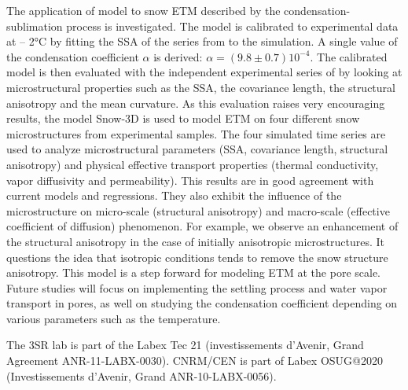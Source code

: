 \documentclass[draft,ms]{agujournal2019}
\begin{document}
The application of  model to snow ETM described by the condensation-sublimation process is investigated. The model is calibrated to experimental data at – 2°C by fitting the SSA of the series from  to the simulation. A single value of the condensation coefficient $\alpha$ is derived: $\alpha = ( 9.8 \pm 0.7) 10^{-4}$. The calibrated model is then evaluated with the independent experimental series of  by looking at microstructural properties such as the SSA, the covariance length, the structural anisotropy and the mean curvature. As this evaluation raises very encouraging results, the model Snow-3D is used to model ETM on four different snow microstructures from experimental samples. The four simulated time series are used to analyze microstructural parameters (SSA, covariance length, structural anisotropy) and physical effective transport properties (thermal conductivity, vapor diffusivity and permeability). This results are in good agreement with current models and regressions. They also exhibit the influence of the microstructure on micro-scale (structural anisotropy) and macro-scale (effective coefficient of diffusion) phenomenon. For example, we observe an enhancement of the structural anisotropy in the case of initially anisotropic microstructures. It questions the idea that isotropic conditions tends to remove the snow structure anisotropy. This model is a step forward for modeling ETM at the pore scale. Future studies will focus on implementing the settling process and water vapor transport in pores, as well on studying the condensation coefficient depending on various parameters such as the temperature.  

\acknowledgments
The 3SR lab is part of the Labex Tec 21 (investissements d'Avenir, Grand Agreement ANR-11-LABX-0030). CNRM/CEN is part of Labex OSUG@2020 (Investissements d'Avenir, Grand ANR-10-LABX-0056).

\end{document}
